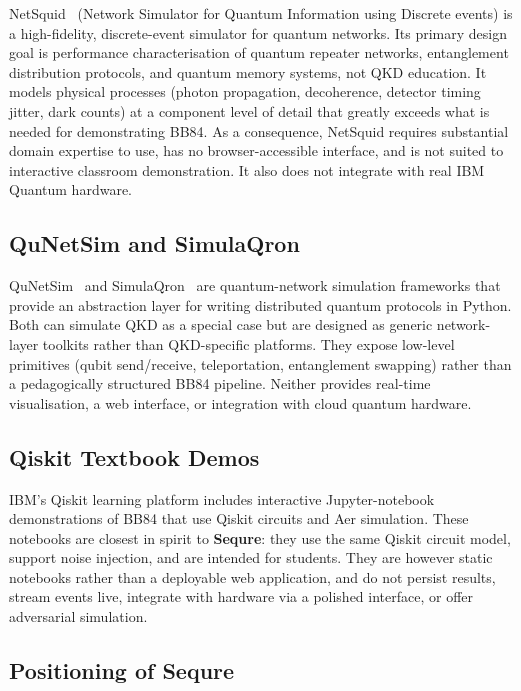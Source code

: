 \documentclass[12pt, a4paper]{article}
\begin{document}
NetSquid~\cite{netsquid2021} (Network Simulator for Quantum Information using
Discrete events) is a high-fidelity, discrete-event simulator for quantum
networks. Its primary design goal is performance characterisation of
quantum repeater networks, entanglement distribution protocols, and
quantum memory systems, not QKD education. It models physical processes
(photon propagation, decoherence, detector timing jitter, dark counts) at a
component level of detail that greatly exceeds what is needed for
demonstrating BB84. As a consequence, NetSquid requires substantial
domain expertise to use, has no browser-accessible interface, and is not
suited to interactive classroom demonstration. It also does not integrate
with real IBM Quantum hardware.

\subsection{QuNetSim and SimulaQron}
\label{sec:qunetsim}

QuNetSim~\cite{qunetsim2021} and SimulaQron~\cite{simulaqron2018} are
quantum-network simulation frameworks that provide an abstraction layer
for writing distributed quantum protocols in Python. Both can simulate
QKD as a special case but are designed as generic network-layer toolkits
rather than QKD-specific platforms. They expose low-level primitives
(qubit send/receive, teleportation, entanglement swapping) rather than
a pedagogically structured BB84 pipeline. Neither provides real-time
visualisation, a web interface, or integration with cloud quantum hardware.

\subsection{Qiskit Textbook Demos}
\label{sec:qiskit-textbook}

IBM's Qiskit learning platform includes interactive Jupyter-notebook
demonstrations of BB84 that use Qiskit circuits and Aer simulation.
These notebooks are closest in spirit to \textbf{Sequre}: they use the same
Qiskit circuit model, support noise injection, and are intended for
students. They are however static notebooks rather than a deployable
web application, and do not persist results, stream events live,
integrate with hardware via a polished interface, or offer adversarial
simulation.

\subsection{Positioning of Sequre}
\label{sec:sequre-positioning}
\end{document}
